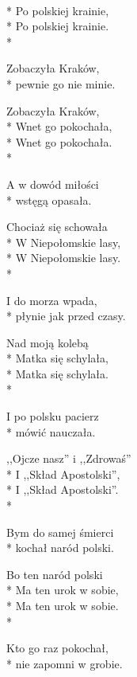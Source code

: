 \begin{lyrics}[multicol=true,longestline={,,Ojcze nasz'' i ,,Zdrowaś''}]

\\*
Po polskiej krainie,\\*
Po polskiej krainie.\\*
\begin{markverses}%
Zobaczyła Kraków,\\*
pewnie go nie minie.
\end{markverses}

Zobaczyła Kraków,\\*
Wnet go pokochała,\\*
Wnet go pokochała.\\*
\begin{markverses}%
A w dowód miłości\\*
wstęgą opasała.
\end{markverses}

Chociaż się schowała\\*
W Niepołomskie lasy,\\*
W Niepołomskie lasy.\\*
\begin{markverses}%
I do morza wpada,\\*
płynie jak przed czasy.
\end{markverses}

Nad moją kolebą\\*
Matka się schylała,\\*
Matka się schylała.\\*
\begin{markverses}%
I po polsku pacierz\\*
mówić nauczała.
\end{markverses}

,,Ojcze nasz'' i ,,Zdrowaś''\\*
I ,,Skład Apostolski'',\\*
I ,,Skład Apostolski''.\\*
\begin{markverses}%
Bym do samej śmierci\\*
kochał naród polski.
\end{markverses}

Bo ten naród polski\\*
Ma ten urok w sobie,\\*
Ma ten urok w sobie.\\*
\begin{markverses}%
Kto go raz pokochał,\\*
nie zapomni w grobie.
\end{markverses}


\end{lyrics}
